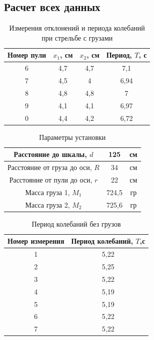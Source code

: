 \documentclass[a4paper]{article}
\begin{document}
\subsection{Расчет всех данных}

\begin{table}[h!]
\begin{center}
\begin{tabular}{|c|c|c|c|}
\hline
Номер пули & $x_{1}$, см & $x_{2}$, см & Период, $T$, с \\ \hline
6          & 4,7     & 4,7     & 7,1         \\ \hline
7          & 4,5     & 4       & 6,94        \\ \hline
8          & 4,8     & 4,8     & 7           \\ \hline
9          & 4,1     & 4,1     & 6,97        \\ \hline
0          & 4,4     & 4,2     & 6,72        \\ \hline
\end{tabular}
\caption{Измерения отклонений и периода колебаний при стрельбе с грузами}
\end{center}
\end{table}

\begin{table}[h!]
\begin{center}
\begin{tabular}{|c|c|c|}
\hline
Расстояние до шкалы, $d$        & 125   & см \\ \hline
Расстояние от груза до оси, $R$ & 34    & см \\ \hline
Расстояние от пули до оси, $r$  & 22    & см \\ \hline
Масса груза 1, $M_{1}$             & 724,5 & гр \\ \hline
Масса груза 2, $M_{2}$             & 725,6 & гр \\ \hline
\end{tabular}
\caption{Параметры установки}
\end{center}
\end{table}

\begin{table}[h!]
\begin{center}
\begin{tabular}{|c|c|}
\hline
Номер измерения & Период колебаний, $T$,с \\ \hline
1               & 5,22                  \\ \hline
2               & 5,25                  \\ \hline
3               & 5,22                  \\ \hline
4               & 5,19                  \\ \hline
5               & 5,19                  \\ \hline
6               & 5,22                  \\ \hline
7               & 5,22                  \\ \hline
\end{tabular}
\caption{Период колебаний без грузов}
\end{center}
\end{table}
\end{document}
